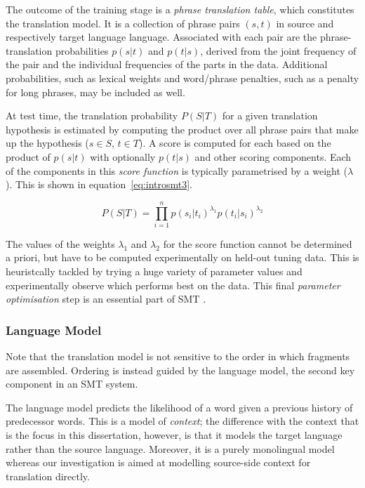 The outcome of the training stage is a \emph{phrase translation table}, which
constitutes the translation model. It is a collection of phrase pairs $(s,t)$
in source and respectively target language language. Associated with each pair
are the phrase-translation probabilities $p(s|t)$ and $p(t|s)$, derived from
the joint frequency of the pair and the individual frequencies of the parts in
the data. Additional probabilities, such as lexical weights and word/phrase
penalties, such as a penalty for long phrases, may be included as well.

At test time, the translation probability $P(S|T)$ for a given translation
hypothesis is estimated by computing the product over all phrase pairs that
make up the hypothesis ($s \in S$, $t \in T$). A score is computed for each
based on the product of $p(s|t)$ with optionally $p(t|s)$ and other scoring
components. Each of the components in this \emph{score function}
is typically parametrised by a weight ($\lambda$). This is shown in equation~\ref{eq:introsmt3}.

\begin{equation}
P(S|T) = \prod_{i=1}^{n} p(s_i|t_i)^{\lambda_1} p(t_i|s_i)^{\lambda_2}
\label{eq:introsmt3}
\end{equation}

The values of the weights $\lambda_1$ and $\lambda_2$ for the score function cannot be determined a priori,
but have to be computed experimentally on held-out tuning data. This is heuristcally tackled by trying a huge variety of parameter values and experimentally
observe which performs best on the data.  This final \emph{parameter
optimisation} step is an essential part of SMT \citep{MERT}.

\subsubsection{Language Model}

Note that the translation model is not sensitive to the order in which
fragments are assembled. Ordering is instead guided by the language model,
the second key component in an SMT system.

The language model predicts the likelihood of a word given a previous history
of predecessor words. This is a model of \emph{context}; the difference with
the context that is the focus in this dissertation, however, is that it models
the target language rather than the source language. Moreover, it is a purely
monolingual model whereas our investigation is aimed at modelling source-side
context for translation directly.

